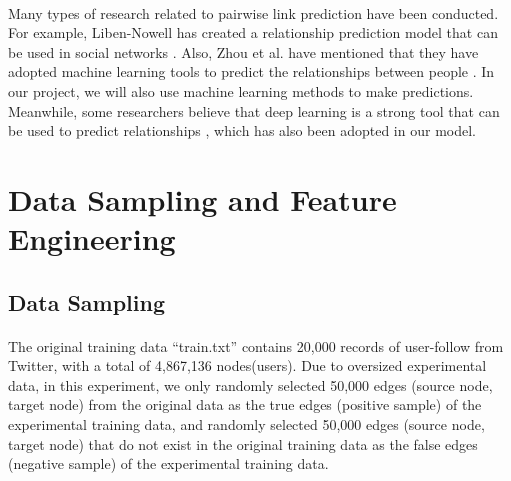 \documentclass[fleqn,11pt]{olplainarticle}
\begin{document}
\paragraph*{}
Many types of research related to pairwise link prediction have been conducted. For example, Liben-Nowell has created a relationship prediction model that can be used in social networks \citep{liben2007link}. Also, Zhou et al. have mentioned that they have adopted machine learning tools to predict the relationships between people \citep{lu2011link}. In our project, we will also use machine learning methods to make predictions. Meanwhile, some researchers believe that deep learning is a strong tool that can be used to predict relationships \citep{wang2019}, which has also been adopted in our model.



\section{Data Sampling and Feature Engineering}\label{datafeature}

\subsection{Data Sampling}\label{data}
\paragraph*{}
The original training data “train.txt” contains 20,000 records of user-follow from Twitter, with a total of 4,867,136 nodes(users). Due to oversized experimental data, in this experiment, we only randomly selected 50,000 edges (source node, target node) from the original data as the true edges (positive sample) of the experimental training data, and randomly selected 50,000 edges (source node, target node)  that do not exist in the original training data as the false edges (negative sample) of the experimental training data.
\end{document}
